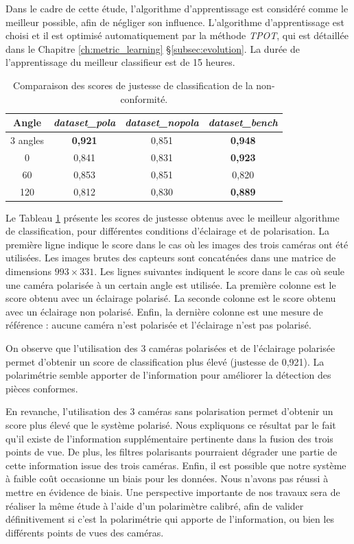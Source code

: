 Dans le cadre de cette étude, l'algorithme d'apprentissage est considéré comme le meilleur possible, afin de négliger son influence.
L'algorithme d'apprentissage est choisi et il est optimisé automatiquement par la méthode \textit{TPOT}, qui est détaillée dans le Chapitre \ref{ch:metric_learning} §\ref{subsec:evolution}.
La durée de l'apprentissage du meilleur classifieur est de 15 heures.

\begin{table}[hbtp]
	\begin{center} 
		\begin{tabular}{|c|c|c|c|}
			\hline
			Angle & \textit{dataset\_pola} & \textit{dataset\_nopola} & \textit{dataset\_bench}\\
			\hline
			\hline
			3 angles   & \textbf{0,921} & 0,851 & \textbf{0,948} \\
			0\degree   &         0,841  & 0,831 & \textbf{0,923} \\
			60\degree  &         0,853  & 0,851 &         0,820  \\
			120\degree &         0,812  & 0,830 & \textbf{0,889} \\
			\hline
		\end{tabular}
	\end{center}
	\caption{Comparaison des scores de justesse de classification de la non-conformité.}
	\label{tab:perfAutoML}
\end{table}

Le Tableau \ref{tab:perfAutoML} présente les scores de justesse obtenus avec le meilleur algorithme de classification, pour différentes conditions d'éclairage et de polarisation.
La première ligne indique le score dans le cas où les images des trois caméras ont été utilisées.
Les images brutes des capteurs sont concaténées dans une matrice de dimensions $993\times 331$.
Les lignes suivantes indiquent le score dans le cas où seule une caméra polarisée à un certain angle est utilisée.
La première colonne est le score obtenu avec un éclairage polarisé.
La seconde colonne est le score obtenu avec un éclairage non polarisé.
Enfin, la dernière colonne est une mesure de référence : aucune caméra n'est polarisée et l'éclairage n'est pas polarisé.

On observe que l'utilisation des 3 caméras polarisées et de l'éclairage polarisée permet d'obtenir un score de classification plus élevé (justesse de 0,921).
La polarimétrie semble apporter de l'information pour améliorer la détection des pièces conformes.

En revanche, l'utilisation des 3 caméras sans polarisation permet d'obtenir un score plus élevé que le système polarisé.
Nous expliquons ce résultat par le fait qu'il existe de l'information supplémentaire pertinente dans la fusion des trois points de vue.
De plus, les filtres polarisants pourraient dégrader une partie de cette information issue des trois caméras.
Enfin, il est possible que notre système à faible coût occasionne un biais pour les données.
Nous n'avons pas réussi à mettre en évidence de biais.
Une perspective importante de nos travaux sera de réaliser la même étude à l'aide d'un polarimètre calibré, afin de valider définitivement si c'est la polarimétrie qui apporte de l'information, ou bien les différents points de vues des caméras.

